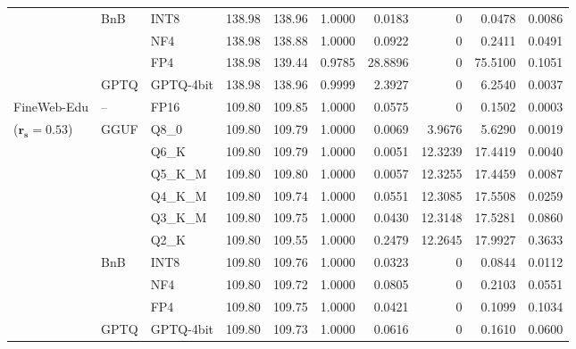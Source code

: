 \begin{longtable}{ll l rrrrrrr}
 & BnB & INT8 & 138.98 & 138.96 & 1.0000 & 0.0183 & \cellcolor{cyan!12} $0$ & 0.0478 & 0.0086 \\
 &  & NF4 & 138.98 & 138.88 & 1.0000 & 0.0922 & \cellcolor{cyan!12} $0$ & 0.2411 & 0.0491 \\
 &  & FP4 & 138.98 & 139.44 & 0.9785 & 28.8896 & \cellcolor{cyan!12} $0$ & 75.5100 & 0.1051 \\
 & GPTQ & GPTQ-4bit & 138.98 & 138.96 & 0.9999 & 2.3927 & \cellcolor{cyan!12} $0$ & 6.2540 & 0.0037 \\
\midrule
FineWeb-Edu & -- & FP16 & 109.80 & 109.85 & 1.0000 & 0.0575 & \cellcolor{cyan!12} $0$ & 0.1502 & 0.0003 \\
{\small ($\mathbf{r_s{=}0.53}$)} & GGUF & Q8\_0 & 109.80 & 109.79 & 1.0000 & 0.0069 & 3.9676 & 5.6290 & 0.0019 \\
 &  & Q6\_K & 109.80 & 109.79 & 1.0000 & 0.0051 & 12.3239 & 17.4419 & 0.0040 \\
 &  & Q5\_K\_M & 109.80 & 109.80 & 1.0000 & 0.0057 & 12.3255 & 17.4459 & 0.0087 \\
 &  & Q4\_K\_M & 109.80 & 109.74 & 1.0000 & 0.0551 & 12.3085 & 17.5508 & 0.0259 \\
 &  & Q3\_K\_M & 109.80 & 109.75 & 1.0000 & 0.0430 & 12.3148 & 17.5281 & 0.0860 \\
 &  & Q2\_K & 109.80 & 109.55 & 1.0000 & 0.2479 & 12.2645 & 17.9927 & 0.3633 \\
 & BnB & INT8 & 109.80 & 109.76 & 1.0000 & 0.0323 & \cellcolor{cyan!12} $0$ & 0.0844 & 0.0112 \\
 &  & NF4 & 109.80 & 109.72 & 1.0000 & 0.0805 & \cellcolor{cyan!12} $0$ & 0.2103 & 0.0551 \\
 &  & FP4 & 109.80 & 109.75 & 1.0000 & 0.0421 & \cellcolor{cyan!12} $0$ & 0.1099 & 0.1034 \\
 & GPTQ & GPTQ-4bit & 109.80 & 109.73 & 1.0000 & 0.0616 & \cellcolor{cyan!12} $0$ & 0.1610 & 0.0600 \\
\end{longtable}
\endgroup